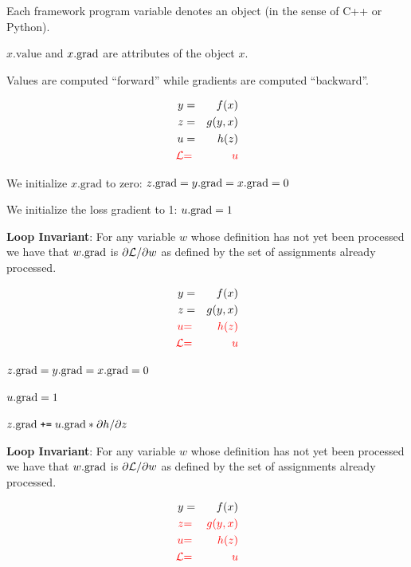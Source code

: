 {\medskip
Each framework program variable denotes an {\color{red} object} (in the sense of C++ or Python).

\medskip
{\color{red} $x.\mathrm{value}$} and {\color{red} $x.\mathrm{grad}$} are attributes of the {\color{red} object $x$}.

\bigskip
Values are computed ``forward'' while gradients are computed ``backward''.


\vspace{-3ex}
\begin{eqnarray*}
  y & = & f(x) \\
  z & = & g(y,x) \\
  u & = & h(z) \\
  {\color{red} {\cal L}} &  {\color{red} =} & {\color{red}  u}
\end{eqnarray*}


\bigskip
We initialize {\color{red} $x.\mathrm{grad}$} to zero: {\color{red} $z.\mathrm{grad} = y.\mathrm{grad} = x.\mathrm{grad} = 0$}

\bigskip
We initialize the loss gradient to 1: {\color{red} $u.\mathrm{grad} = 1$}

\medskip
{\bf Loop Invariant}: For any variable $w$ whose definition has not yet been processed we have that $w.\mathrm{grad}$ is $\partial {\cal L}/\partial w$ as defined by the set of assignments already processed.

\vspace{-3ex}
\begin{eqnarray*}
  y & = & f(x) \\
  z & = & g(y,x) \\
  {\color{red} u} & {\color{red} =} & {\color{red} h(z)} \\
  {\color{red} {\cal L}} & {\color{red}  =} &  {\color{red} u}
\end{eqnarray*}

{\color{red}
\medskip
$z.\mathrm{grad} = y.\mathrm{grad} = x.\mathrm{grad} = 0$

\medskip
$u.\mathrm{grad} = 1$

\medskip
$z.\mathrm{grad}\;\mbox{\tt +=}\; u.\mathrm{grad} * {\partial h}/{\partial z}$

}

\medskip
{\bf Loop Invariant}: For any variable $w$ whose definition has not yet been processed we have that $w.\mathrm{grad}$ is $\partial {\cal L}/\partial w$ as defined by the set of assignments already processed.

\vspace{-3ex}
\begin{eqnarray*}
  y & = & f(x) \\
  {\color{red} z} & {\color{red} =} & {\color{red} g(y,x)} \\
  {\color{red} u} & {\color{red} =} & {\color{red} h(z)} \\
  {\color{red} {\cal L}} & {\color{red} =} & {\color{red}  u}
\end{eqnarray*}

}
